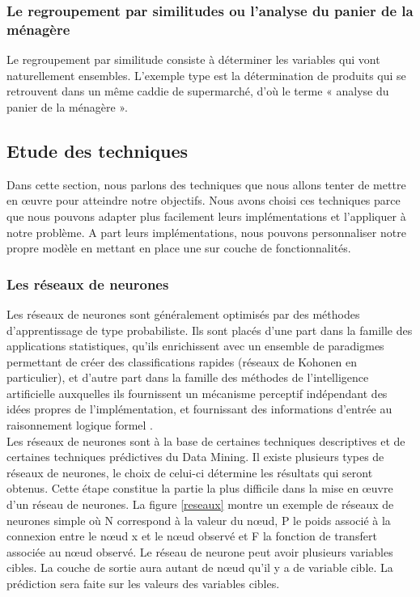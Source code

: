 \documentclass[11pt,a4paper]{report}
\begin{document}
\subsubsection{Le regroupement par similitudes ou l'analyse du panier de la ménagère}
Le regroupement par similitude consiste à déterminer les variables qui vont naturellement ensembles. L’exemple type est la détermination de produits qui se retrouvent dans un même caddie de supermarché, d’où le terme « analyse du panier de la ménagère ».

\subsection{Etude des techniques \label{etude_technique}}
Dans cette section, nous parlons des techniques que nous allons tenter de mettre en œuvre pour atteindre notre objectifs. Nous avons choisi ces techniques parce que nous pouvons adapter plus facilement leurs implémentations et l'appliquer à notre problème. A part leurs implémentations, nous pouvons personnaliser notre propre modèle en mettant en place une sur couche de fonctionnalités.   
\subsubsection{Les réseaux de neurones \label{reseaux_neurone}}
Les réseaux de neurones sont généralement optimisés par des méthodes d’apprentissage de type probabiliste. Ils sont placés d’une part dans la famille des applications statistiques, qu’ils enrichissent avec un ensemble de paradigmes permettant de créer des classifications rapides (réseaux de Kohonen en particulier), et d’autre part dans la famille des méthodes de l’intelligence artificielle auxquelles ils fournissent un mécanisme perceptif indépendant des idées propres de l'implémentation, et fournissant des informations d'entrée au raisonnement logique formel \cite{reseaux}.\\ 

Les réseaux de neurones sont à la base de certaines techniques descriptives et de certaines techniques prédictives du Data Mining. Il existe plusieurs types de réseaux de neurones, le choix de celui-ci détermine les résultats qui seront obtenus. Cette étape constitue la partie la plus difficile dans la mise en œuvre d'un réseau de neurones. La figure \ref{reseaux} montre un exemple de réseaux de neurones simple où N correspond à la valeur du nœud, P le poids associé à la connexion entre le nœud x et le nœud observé et F la fonction de transfert associée au nœud observé. Le réseau de neurone peut avoir plusieurs variables cibles. La couche de sortie aura autant de nœud qu'il y a de variable cible. La prédiction sera faite sur les valeurs des variables cibles.
\end{document}
